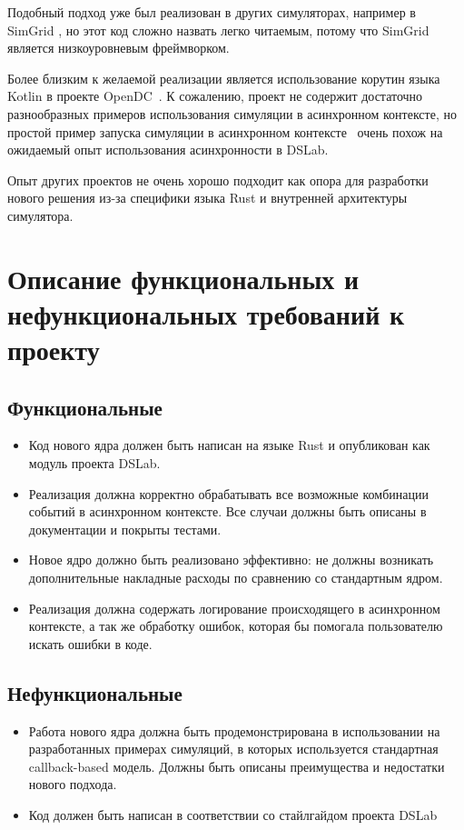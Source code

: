 Подобный подход уже был реализован в других симуляторах, например в SimGrid \cite{simgrid-example}, но этот код сложно назвать легко читаемым, потому что SimGrid является низкоуровневым фреймворком.

Более близким к желаемой реализации является использование корутин языка Kotlin в проекте OpenDC~\cite{opendc-repo}. К сожалению, проект не содержит достаточно разнообразных примеров использования симуляции в асинхронном контексте, но простой пример запуска симуляции в асинхронном контексте~\cite{opendc-example} очень похож на ожидаемый опыт использования асинхронности в DSLab.


Опыт других проектов не очень хорошо подходит как опора для разработки нового решения из-за специфики языка Rust и внутренней архитектуры симулятора.

\newpage 

\section{Описание функциональных и нефункциональных требований к проекту}

\subsection{Функциональные}
\begin{itemize}
    \item Код нового ядра должен быть написан на языке Rust и опубликован как модуль проекта DSLab.
    \item Реализация должна корректно обрабатывать все возможные комбинации событий в асинхронном контексте. Все случаи должны быть описаны в документации и покрыты тестами.
    \item Новое ядро должно быть реализовано эффективно: не должны возникать дополнительные накладные расходы по сравнению со стандартным ядром.
    \item Реализация должна содержать логирование происходящего в асинхронном контексте, а так же обработку ошибок, которая бы помогала пользователю искать ошибки в коде. 
\end{itemize}

\subsection{Нефункциональные}
\begin{itemize}
    \item Работа нового ядра должна быть продемонстрирована в использовании на разработанных примерах симуляций, в которых используется стандартная callback-based модель. Должны быть описаны преимущества и недостатки нового подхода.
    \item Код должен быть написан в соответствии со стайлгайдом проекта DSLab
\end{itemize}

